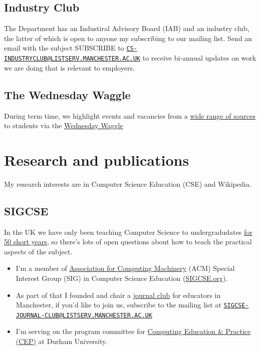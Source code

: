 \documentclass[12pt,]{book}
\providecommand{\tightlist}{%
  \setlength{\itemsep}{0pt}\setlength{\parskip}{0pt}}
\begin{document}
\hypertarget{industry-club}{%
\section{Industry Club}\label{industry-club}}

The Department has an Industiral Advisory Board (IAB) and an industry club, the latter of which is open to anyone my subscribing to our mailing list. Send an email with the subject SUBSCRIBE to \href{mailto:CS-INDUSTRYCLUB@LISTSERV.MANCHESTER.AC.UK}{\nolinkurl{CS-INDUSTRYCLUB@LISTSERV.MANCHESTER.AC.UK}} to receive bi-annual updates on work we are doing that is relevant to employers.

\hypertarget{the-wednesday-waggle}{%
\section{The Wednesday Waggle}\label{the-wednesday-waggle}}

During term time, we highlight events and vacancies from a \href{http://dullhunk.github.io/where-can-I-look-for-jobs.html}{wide range of sources} to students via the \href{https://waggle.cs.manchester.ac.uk/waggle/about}{Wednesday Waggle}

\hypertarget{research-and-publications}{%
\chapter{Research and publications}\label{research-and-publications}}

My research interests are in Computer Science Education (CSE) and Wikipedia. 🔬

\hypertarget{sigcse}{%
\section{SIGCSE}\label{sigcse}}

In the UK we have only been teaching Computer Science to undergradudates \href{http://www.bbc.co.uk/manchester/content/articles/2005/11/07/baby_computer_40_interview_feature.shtml}{for 50 short years}, so there's lots of open questions about how to teach the practical aspects of the subject.

\begin{itemize}
\tightlist
\item
  I'm a member of \href{https://en.wikipedia.org/wiki/Association_for_Computing_Machinery}{Association for Computing Machinery} (ACM) Special Interest Group (SIG) in Computer Science Education (\href{https://sigcse.org}{SIGCSE.org}).
\item
  As part of that I founded and chair a \href{https://duncan.hull.name/2019/07/17/sigcse-journal-club/}{journal club} for educators in Manchester, if you'd like to join us, subscribe to the mailing list at \href{mailto:SIGCSE-JOURNAL-CLUB@LISTSERV.MANCHESTER.AC.UK}{\nolinkurl{SIGCSE-JOURNAL-CLUB@LISTSERV.MANCHESTER.AC.UK}}
\item
  I'm serving on the program committee for \href{http://community.dur.ac.uk/cep.conference}{Computing Education \& Practice (CEP)} at Durham University.
\end{itemize}
\end{document}
